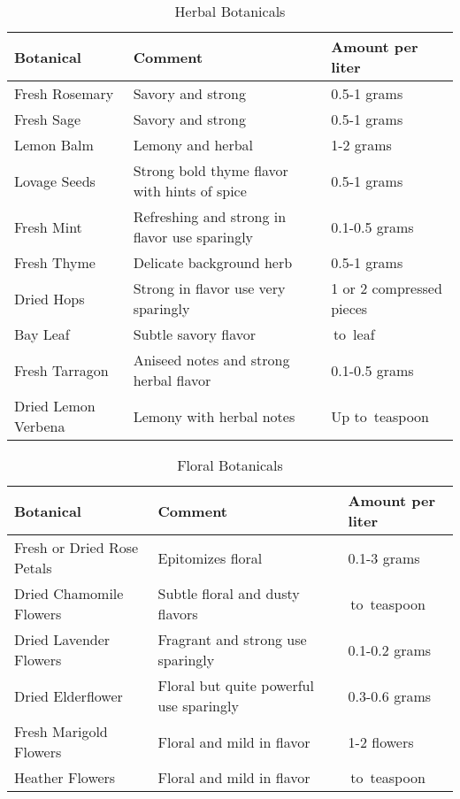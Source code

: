 \documentclass[letterpaper]{recipePMG}
\newcommand{\quarter}{\nicefrac{1}{4} \,}
\newcommand{\half}{\nicefrac{1}{2} \,}
\begin{document}
\begin{table}[H]
    \centering
    \caption{Herbal Botanicals}
    \begin{tabular}{@{}p{1.25in}p{3in}p{1.25in}@{}}
        \toprule
      Botanical &  Comment & Amount per liter \\
        \midrule
		Fresh Rosemary & Savory and strong &  0.5-1 grams \\
		Fresh Sage & Savory and strong & 0.5-1 grams \\
		Lemon Balm & Lemony and herbal & 1-2 grams \\
		Lovage Seeds & Strong bold thyme flavor with hints of spice & 0.5-1 grams\\
		Fresh Mint & Refreshing and strong in flavor use sparingly & 0.1-0.5 grams\\
		Fresh Thyme & Delicate background herb & 0.5-1 grams \\
		Dried Hops & Strong in flavor use very sparingly & 1 or 2 compressed pieces\\
		Bay Leaf & Subtle savory flavor & \quarter to \half leaf \\
		Fresh Tarragon &  Aniseed notes and strong herbal flavor & 0.1-0.5 grams\\
		Dried Lemon Verbena & Lemony with herbal notes & Up to \half teaspoon \\
\end{tabular}
    \label{tab:herbal}
\end{table}

\begin{table}[H]
    \centering
    \caption{Floral Botanicals}
    \begin{tabular}{@{}p{1.25in}p{3in}p{1.25in}@{}}
        \toprule
      Botanical &  Comment & Amount per liter \\
        \midrule
		Fresh or Dried Rose Petals & Epitomizes floral & 0.1-3 grams \\
		Dried Chamomile Flowers & Subtle floral and dusty flavors & \quarter to \half teaspoon \\
		Dried Lavender Flowers & Fragrant and strong use sparingly & 0.1-0.2 grams \\
		Dried Elderflower & Floral but quite powerful use sparingly & 0.3-0.6 grams \\
		Fresh Marigold Flowers & Floral and mild in flavor & 1-2 flowers \\
		Heather Flowers & Floral and mild in flavor & \quarter to \half teaspoon \\
\end{tabular}
    \label{tab:floral}
\end{table}
\end{document}
